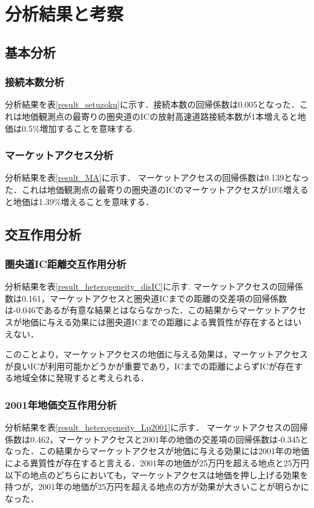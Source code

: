 \chapter{分析結果と考察}
\section{基本分析}
\subsection{接続本数分析}
分析結果を表\ref{result_setuzoku}に示す．接続本数の回帰係数は0.005となった．これは地価観測点の最寄りの圏央道のICの放射高速道路接続本数が1本増えると地価は0.5\%増加することを意味する.

\subsection{マーケットアクセス分析}
分析結果を表\ref{result_MA}に示す．
マーケットアクセスの回帰係数は0.139となった．これは地価観測点の最寄りの圏央道のICのマーケットアクセスが10\%増えると地価は1.39\%増えることを意味する．

\section{交互作用分析}


\subsection{圏央道IC距離交互作用分析}
分析結果を表\ref{result_heterogeneity_disIC}に示す.
マーケットアクセスの回帰係数は0.161，マーケットアクセスと圏央道ICまでの距離の交差項の回帰係数は-0.046であるが有意な結果とはならなかった．この結果からマーケットアクセスが地価に与える効果には圏央道ICまでの距離による異質性が存在するとはいえない．

このことより，マーケットアクセスの地価に与える効果は，マーケットアクセスが良いICが利用可能かどうかが重要であり，ICまでの距離によらずICが存在する地域全体に発現すると考えられる．
\subsection{2001年地価交互作用分析}
分析結果を表\ref{result_heterogeneity_Lp2001}に示す．
マーケットアクセスの回帰係数は0.462，マーケットアクセスと2001年の地価の交差項の回帰係数は-0.345となった．この結果からマーケットアクセスが地価に与える効果には2001年の地価による異質性が存在すると言える．2001年の地価が25万円を超える地点と25万円以下の地点のどちらにおいても，マーケットアクセスは地価を押し上げる効果を持つが，2001年の地価が25万円を超える地点の方が効果が大きいことが明らかになった．

